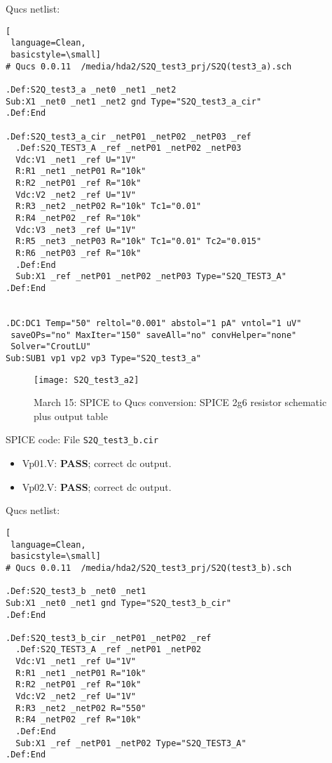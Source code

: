 \begin{flushleft}
\begin{flushleft}
\end{flushleft}

\begin{flushleft}
Qucs netlist:
\begin{lstlisting}[
 language=Clean, 
 basicstyle=\small]
# Qucs 0.0.11  /media/hda2/S2Q_test3_prj/S2Q(test3_a).sch

.Def:S2Q_test3_a _net0 _net1 _net2
Sub:X1 _net0 _net1 _net2 gnd Type="S2Q_test3_a_cir"
.Def:End

.Def:S2Q_test3_a_cir _netP01 _netP02 _netP03 _ref
  .Def:S2Q_TEST3_A _ref _netP01 _netP02 _netP03
  Vdc:V1 _net1 _ref U="1V"
  R:R1 _net1 _netP01 R="10k"
  R:R2 _netP01 _ref R="10k"
  Vdc:V2 _net2 _ref U="1V"
  R:R3 _net2 _netP02 R="10k" Tc1="0.01"
  R:R4 _netP02 _ref R="10k"
  Vdc:V3 _net3 _ref U="1V"
  R:R5 _net3 _netP03 R="10k" Tc1="0.01" Tc2="0.015"
  R:R6 _netP03 _ref R="10k"
  .Def:End
  Sub:X1 _ref _netP01 _netP02 _netP03 Type="S2Q_TEST3_A"
.Def:End


.DC:DC1 Temp="50" reltol="0.001" abstol="1 pA" vntol="1 uV"
 saveOPs="no" MaxIter="150" saveAll="no" convHelper="none"
 Solver="CroutLU"
Sub:SUB1 vp1 vp2 vp3 Type="S2Q_test3_a"

\end{lstlisting}

\begin{figure}
  \centering
  \texttt{[image: S2Q\_test3\_a2]}
  \caption{March 15: SPICE to Qucs conversion: SPICE 2g6 resistor schematic plus output table }
  \label{fig:S2Qtest3_2}
\end{figure} 

\newpage 
SPICE code: File \verb|S2Q_test3_b.cir|

\begin{itemize}
 \item Vp01.V: \textbf{PASS}; correct dc output.
 \item Vp02.V: \textbf{PASS}; correct dc output.
 
 \end{itemize}

Qucs netlist:
\begin{lstlisting}[
 language=Clean, 
 basicstyle=\small]
# Qucs 0.0.11  /media/hda2/S2Q_test3_prj/S2Q(test3_b).sch

.Def:S2Q_test3_b _net0 _net1
Sub:X1 _net0 _net1 gnd Type="S2Q_test3_b_cir"
.Def:End

.Def:S2Q_test3_b_cir _netP01 _netP02 _ref
  .Def:S2Q_TEST3_A _ref _netP01 _netP02
  Vdc:V1 _net1 _ref U="1V"
  R:R1 _net1 _netP01 R="10k"
  R:R2 _netP01 _ref R="10k"
  Vdc:V2 _net2 _ref U="1V"
  R:R3 _net2 _netP02 R="550"
  R:R4 _netP02 _ref R="10k"
  .Def:End
  Sub:X1 _ref _netP01 _netP02 Type="S2Q_TEST3_A"
.Def:End



\end{lstlisting}
\end{flushleft}
\end{flushleft}

